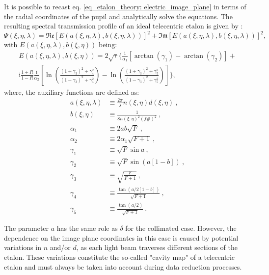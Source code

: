 It is possible to recast eq. \eqref{eq_etalon_theory: electric_image_plane} in terms of the radial coordinates of the pupil and analytically solve the equations. The resulting spectral transmission profile of an ideal telecentric etalon  is given by \citep{franIV}:
\begin{equation}
\Psi \left(\xi, \eta, \lambda \right) =  \mathfrak{Re}\left[E(a\left(\xi, \eta, \lambda \right), b\left(\xi, \eta, \lambda \right)) \right] ^2 + \mathfrak{Im}\left[E(a\left(\xi, \eta, \lambda \right), b\left(\xi, \eta, \lambda \right)) \right] ^2 ,
\label{eq_etalon_theory: Tel_first}
\end{equation}
with $E(a\left(\xi, \eta, \lambda \right), b\left(\xi, \eta \right))$ being:
\begin{multline}
E(a\left(\xi, \eta, \lambda \right), b\left(\xi, \eta \right)) = 2\sqrt{\tau}\Biggl\{ \frac{1}{\alpha_1}\left[\arctan(\gamma _ 1) - \arctan(\gamma_2)\right] + \\
\mathrm{i} \frac{1+R}{1-R} \frac{1}{\alpha_2}\left[\ln \left(\frac{(1 + \gamma _ 3) ^2 + \gamma _ 4 ^2}{(1 - \gamma _ 3) ^2 + \gamma _ 4 ^2} \right) - \ln \left(\frac{(1 + \gamma_ 3) ^2 + \gamma _ 5 ^ 2}{(1 - \gamma _ 3) ^2 + \gamma _ 5 ^2} \right)\right]\Biggr\},  
\end{multline}
where, the auxiliary functions are defined as:
\begin{equation}
\begin{split}
a\left(\xi, \eta, \lambda \right) &\equiv \frac{2 \pi}{\lambda}n\left(\xi, \eta\right)d\left(\xi, \eta\right) \ , \\
b\left(\xi, \eta\right) &\equiv \frac{1}{8n\left(\xi, \eta\right)^2(f\#) ^2}\ ,  \\
\alpha _ 1 &\equiv 2ab\sqrt{F}\ ,  \\
\alpha _ 2 &\equiv 2\alpha_ 1\sqrt{F + 1}\ ,  \\
\gamma _ 1 &\equiv \sqrt{F} \sin a\ ,  \\
\gamma _ 2 &\equiv \sqrt{F} \sin (a[1 - b])\ ,  \\
\gamma _ 3 &\equiv \sqrt{\frac{F}{F + 1}} \ ,  \\
\gamma _ 4 &\equiv \frac{\tan \left( a/2 [1 - b] \right)}{\sqrt{F + 1}}\ ,  \\
\gamma _ 5 &\equiv \frac{\tan (a/2)}{\sqrt{F + 1}}\ .
\label{eq_etalon_theory: a_definition}
\end{split}
\end{equation}

The parameter $a$ has the same role as $\delta$ for the collimated case. However, the dependence on the image plane coordinates in this case is caused by potential variations in $n$ and/or $d$, as each light beam traverses different sections of the etalon. These variations constitute the so-called "cavity map" of a telecentric etalon and must always be taken into account during data reduction processes.

